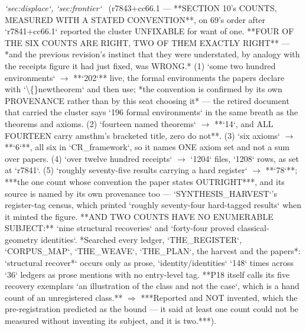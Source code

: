 \begin{description}
\textit{`sec:displace`, `sec:frontier`} \ (r7843+cc66.1 --- **SECTION 10's COUNTS, MEASURED WITH A STATED CONVENTION**, on 69's order after `r7841+cc66.1` reported the cluster UNFIXABLE for want of one.  **FOUR OF THE SIX COUNTS ARE RIGHT, TWO OF THEM EXACTLY RIGHT** --- *and the previous revision's instinct that they were understated, by analogy with the receipts figure it had just fixed, was WRONG.* (1) `some two hundred environments` \ensuremath{\to} **`202`** live, the formal environments the papers declare with `\textbackslash\{\}newtheorem` and then use; *the convention is confirmed by its own PROVENANCE rather than by this seat choosing it* --- the retired document that carried the cluster says `196 formal environments` in the same breath as the theorems and axioms. (2) `fourteen named theorems` \ensuremath{\to} **`14`, and ALL FOURTEEN carry amsthm's bracketed title, zero do not**. (3) `six axioms` \ensuremath{\to} **`6`**, all six in `CR\_framework`, so it names ONE axiom set and not a sum over papers. (4) `over twelve hundred receipts` \ensuremath{\to} `1204` files, `1208` rows, as set at `r7841`. (5) `roughly seventy-five results carrying a hard register` \ensuremath{\to} **`78`**; ***the one count whose convention the paper states OUTRIGHT***, and its source is named by its own provenance too --- `SYNTHESIS\_HARVEST`'s register-tag census, which printed `roughly seventy-four hard-tagged results` when it minted the figure.  **AND TWO COUNTS HAVE NO ENUMERABLE SUBJECT:** `nine structural recoveries` and `forty-four proved classical-geometry identities`. *Searched every ledger, `THE\_REGISTER`, `CORPUS\_MAP`, `THE\_WEAVE`, `THE\_PLAN`, the harvest and the papers*: `structural recover*` occurs only as prose, `identity/identities` `148` times across `36` ledgers as prose mentions with no entry-level tag. **P18 itself calls its five recovery exemplars `an illustration of the class and not the case`, which is a hand count of an unregistered class.** \ensuremath{\Rightarrow} ***Reported and NOT invented, which the pre-registration predicted as the bound --- it said at least one count could not be measured without inventing its subject, and it is two.***). 

\end{description}
